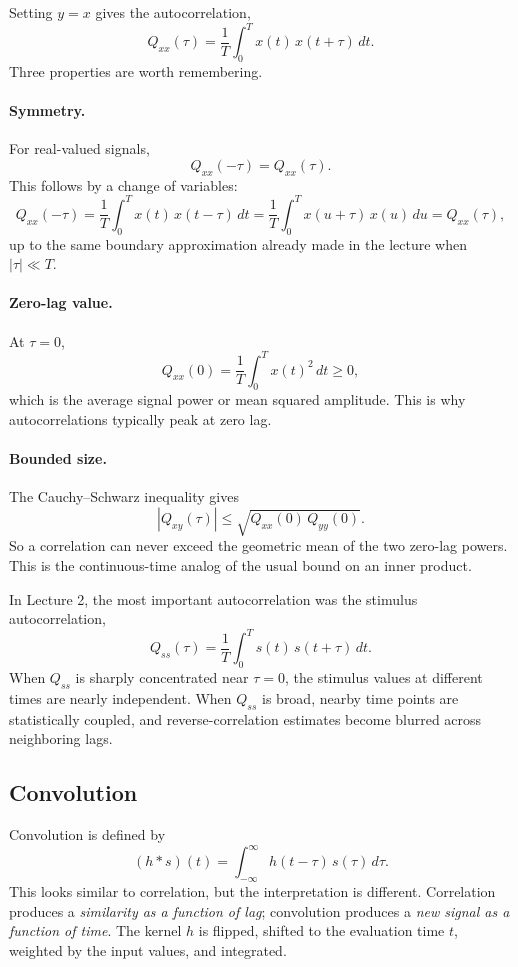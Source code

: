 \documentclass[11pt]{article}
\begin{document}
Setting $y=x$ gives the autocorrelation,
\[
Q_{xx}(\tau)=\frac{1}{T}\int_0^T x(t)\,x(t+\tau)\,dt.
\]
Three properties are worth remembering.

\paragraph{Symmetry.}
For real-valued signals,
\[
Q_{xx}(-\tau)=Q_{xx}(\tau).
\]
This follows by a change of variables:
\[
Q_{xx}(-\tau)=\frac{1}{T}\int_0^T x(t)\,x(t-\tau)\,dt
=\frac{1}{T}\int_0^T x(u+\tau)\,x(u)\,du
=Q_{xx}(\tau),
\]
up to the same boundary approximation already made in the lecture when $|\tau|\ll T$.

\paragraph{Zero-lag value.}
At $\tau=0$,
\[
Q_{xx}(0)=\frac{1}{T}\int_0^T x(t)^2\,dt \ge 0,
\]
which is the average signal power or mean squared amplitude. This is why autocorrelations typically peak at zero lag.

\paragraph{Bounded size.}
The Cauchy--Schwarz inequality gives
\[
|Q_{xy}(\tau)| \le \sqrt{Q_{xx}(0)\,Q_{yy}(0)}.
\]
So a correlation can never exceed the geometric mean of the two zero-lag powers. This is the continuous-time analog of the usual bound on an inner product.

In Lecture 2, the most important autocorrelation was the stimulus autocorrelation,
\[
Q_{ss}(\tau)=\frac{1}{T}\int_0^T s(t)\,s(t+\tau)\,dt.
\]
When $Q_{ss}$ is sharply concentrated near $\tau=0$, the stimulus values at different times are nearly independent. When $Q_{ss}$ is broad, nearby time points are statistically coupled, and reverse-correlation estimates become blurred across neighboring lags.

\subsection{Convolution}

Convolution is defined by
\[
(h*s)(t)=\int_{-\infty}^{\infty} h(t-\tau)\,s(\tau)\,d\tau.
\]
This looks similar to correlation, but the interpretation is different. Correlation produces a \emph{similarity as a function of lag}; convolution produces a \emph{new signal as a function of time}. The kernel $h$ is flipped, shifted to the evaluation time $t$, weighted by the input values, and integrated.
\end{document}
